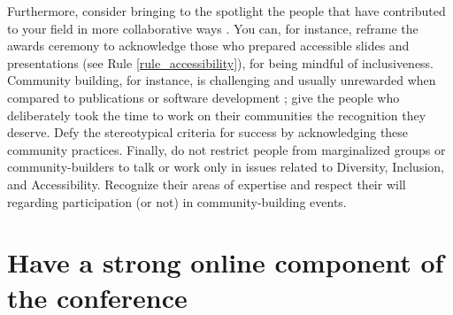 \documentclass[10pt,letterpaper]{article}
\begin{document}
Furthermore, consider bringing to the spotlight the people that have contributed to your field in more collaborative ways \cite{cheng2020x+}. You can, for instance, reframe the awards ceremony to acknowledge those who prepared accessible slides and presentations (see Rule \ref{rule_accessibility}), for being mindful of inclusiveness. Community building, for instance, is challenging and usually unrewarded when compared to publications or software development \cite{acionWhyChooseCommunity2020}; give the people who deliberately took the time to work on their communities the recognition they deserve. Defy the stereotypical criteria for success by acknowledging these community practices. 
Finally, do not restrict people from marginalized groups or community-builders to talk or work only in issues related to Diversity, Inclusion, and Accessibility. Recognize their areas of expertise and respect their will regarding participation (or not) in community-building events.



\section{Have a strong online component of the conference} 
\label{rule_online}
\end{document}
